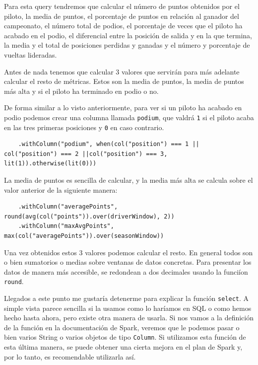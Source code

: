 \documentclass[12pt,twoside,titlepage]{report}
\begin{document}
Para esta query tendremos que calcular el número de puntos obtenidos por el piloto, la media de puntos, el porcentaje de puntos en relación al ganador del campeonato, el número total de podios, el porcentaje de veces que el piloto ha acabado en el podio, el diferencial entre la posición de salida y en la que termina, la media y el total de posiciones perdidas y ganadas y el número y porcentaje de vueltas lideradas.

Antes de nada tenemos que calcular 3 valores que servirán para más adelante calcular el resto de métricas. Estos son la media de puntos, la media de puntos más alta y si el piloto ha terminado en podio o no.

De forma similar a lo visto anteriormente, para ver si un piloto ha acabado en podio podemos crear una columna llamada \texttt{podium}, que valdrá \texttt{1} si el piloto acaba en las tres primeras posiciones y \texttt{0} en caso contrario.

\begin{lstlisting}
	.withColumn("podium", when(col("position") === 1 || col("position") === 2 ||col("position") === 3, lit(1)).otherwise(lit(0)))
\end{lstlisting}

La media de puntos es sencilla de calcular, y la media más alta se calcula sobre el valor anterior de la siguiente manera:

\begin{lstlisting}
	.withColumn("averagePoints", round(avg(col("points")).over(driverWindow), 2))
	.withColumn("maxAvgPoints", max(col("averagePoints")).over(seasonWindow))
\end{lstlisting}

Una vez obtenidos estos 3 valores podemos calcular el resto. En general todos son o bien sumatorios o medias sobre ventanas de datos concretas. Para presentar los datos de manera más accesible, se redondean a dos decimales usando la funciíon \texttt{round}.

Llegados a este punto me gustaría detenerme para explicar la función \texttt{select}. A simple vista parece sencilla si la usamos como lo haríamos en SQL o como hemos hecho hasta ahora, pero existe otra manera de usarla. Si nos vamos a la definición de la función en la documentación de Spark, veremos que le podemos pasar o bien varios String o varios objetos de tipo \texttt{Column}. Si utilizamos esta función de esta última manera, se puede obtener una cierta mejora en el plan de Spark y, por lo tanto, es recomendable utilizarla así.
\end{document}
